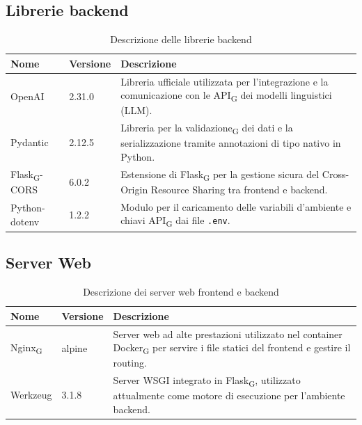 \documentclass[11pt,a4paper]{article}
\newcommand{\gls}[1]{#1\textsubscript{G}}
\begin{document}
\subsection{Librerie backend}
\begin{table}[H]
    \centering
    \begin{tabular}{|p{}|p{}|p{}|}
        \hline
        \textbf{Nome} & \textbf{Versione} & \textbf{Descrizione} \\
        \hline
        OpenAI & 2.31.0 & Libreria ufficiale utilizzata per l'integrazione e la comunicazione con le \gls{API} dei modelli linguistici (LLM). \\
        \hline
        Pydantic & 2.12.5 & Libreria per la \gls{validazione} dei dati e la serializzazione tramite annotazioni di tipo nativo in Python. \\
        \hline
        \gls{Flask}-CORS & 6.0.2 & Estensione di \gls{Flask} per la gestione sicura del Cross-Origin Resource Sharing tra frontend e backend. \\
        \hline
        Python-dotenv & 1.2.2 & Modulo per il caricamento delle variabili d'ambiente e chiavi \gls{API} dai file \texttt{.env}. \\
        \hline
    \end{tabular}
    \caption{Descrizione delle librerie backend}
    \label{tab:librerie_backend}
\end{table}

\subsection{Server Web}
\begin{table}[H]
    \centering
    \begin{tabular}{|p{}|p{}|p{}|}
        \hline
        \textbf{Nome} & \textbf{Versione} & \textbf{Descrizione} \\
        \hline
        \gls{Nginx} & alpine & Server web ad alte prestazioni utilizzato nel container \gls{Docker} per servire i file statici del frontend e gestire il routing. \\
        \hline
        Werkzeug & 3.1.8 & Server WSGI integrato in \gls{Flask}, utilizzato attualmente come motore di esecuzione per l'ambiente backend. \\
        \hline
    \end{tabular}
    \caption{Descrizione dei server web frontend e backend}
    \label{tab:server_web}
\end{table}
\end{document}
